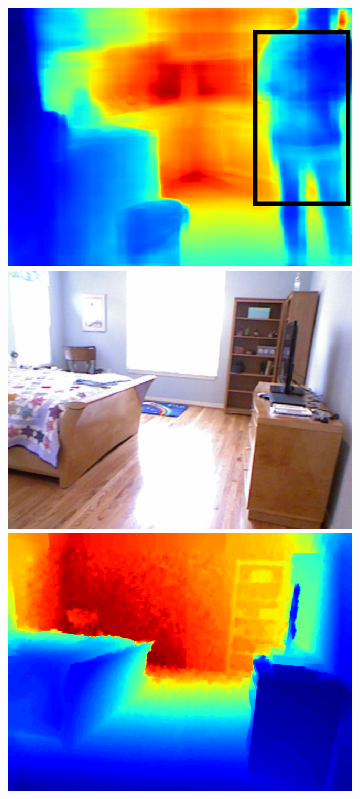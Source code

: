 \begin{figure}[htb]
\begin{subfigure}{0.15\linewidth}
\begin{minipage}[t]{1\linewidth}
  \includegraphics[width=1\linewidth]{figure/nyu_without/kitchen_rgb_00566.png}
  \includegraphics[width=1\linewidth]{figure/nyu_rgb/1149.png}
  \includegraphics[width=1\linewidth]{figure/nyu_gt/1149.png}

\end{minipage}
\end{subfigure}
\end{figure}
